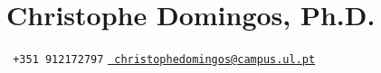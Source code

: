 
\section*{\Large\bfseries Christophe Domingos, Ph.D.%
\hspace{1em}
%
\hspace{0.2em}
%
}

\begin{flushleft}
\faPhone\texttt{ +351 912172797}\hspace{1em}
\href{mailto:christophedomingos@campus.ul.pt}{\faEnvelope\texttt{ christophedomingos@campus.ul.pt}} \\
\vspace{0.5em}
\href{https://www.linkedin.com/in/christophe-domingos/}{\faLinkedin\texttt{}} \hspace{1.95em}
\href{https://orcid.org/0000-0001-5855-1372}{\faOrcid\texttt{}} \hspace{1.95em}
\href{https://scholar.google.com/citations?user=kVkNSJ0AAAAJ&hl=pt-PT&authuser=1}{\faGoogle\texttt{}} \hspace{1.95em}
\href{https://github.com/ChristopheDomingos}{\faGithub\texttt{}}
\end{flushleft}







